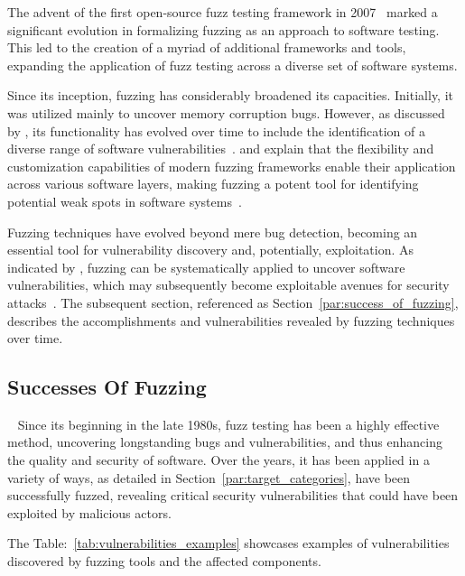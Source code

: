 The advent of the first open-source fuzz testing framework in 2007~\cite{takanen2009fuzzing}
marked a significant evolution in formalizing fuzzing as an approach to software testing.
This led to the creation of a myriad of additional frameworks and tools, expanding the
application of fuzz testing across a diverse set of software systems.

Since its inception, fuzzing has considerably broadened its capacities.
Initially, it was utilized mainly to uncover memory corruption bugs. However,
as discussed by , its functionality has
evolved over time to include the identification of a diverse range of
software vulnerabilities~\cite{bohme2020fuzzing}.  and 
explain that the flexibility and customization capabilities of modern fuzzing
frameworks enable their application across various software layers,
making fuzzing a potent tool for identifying potential weak spots in
software systems~\cite{takanen2009fuzzing}.

Fuzzing techniques have evolved beyond mere bug detection, becoming an essential
tool for vulnerability discovery and, potentially, exploitation.
As indicated by \citeauthor{beaman2022fuzzing}, fuzzing can be
systematically applied to uncover software vulnerabilities, which
may subsequently become exploitable avenues for security
attacks~\cite{beaman2022fuzzing}. The subsequent section, referenced as
Section~\ref{par:success_of_fuzzing}, describes the accomplishments and
vulnerabilities revealed by fuzzing techniques over time.

\subsection{Successes Of Fuzzing}~\label{par:success_of_fuzzing}
Since its beginning in the late 1980s, fuzz testing has been a highly effective
method, uncovering longstanding bugs and vulnerabilities, and thus enhancing the
quality and security of software. Over the years, it has been applied in a
variety of ways, as detailed in Section~\ref{par:target_categories}, have been successfully fuzzed,
revealing critical security vulnerabilities that could have been exploited by malicious actors.

The Table:~\ref{tab:vulnerabilities_examples} showcases examples of vulnerabilities discovered by
fuzzing tools and the affected components.

